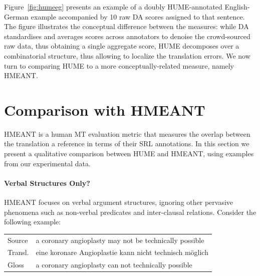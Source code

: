 \documentclass[11pt,letterpaper]{article}
\begin{document}

Figure~\ref{fig:humeeg} presents an example of a doubly HUME-annotated English-German example
accompanied by 10 raw DA scores assigned to that sentence.
The figure illustrates the conceptual difference between the measures:
while DA standardises and averages scores across annotators to denoise the
crowd-sourced raw data, thus obtaining a single aggregate score,
HUME decomposes over a combinatorial structure, thus allowing to
localize the translation errors. We now turn to comparing HUME to a more
conceptually-related  measure, namely HMEANT.


\section{Comparison with HMEANT}\label{sec:hmeant_comp}


HMEANT is a human MT evaluation metric that measures the overlap between the translation a reference
in terms of their SRL annotations.
In this section we present a qualitative comparison between HUME and HMEANT,
using examples from our experimental data.


\paragraph{Verbal Structures Only?}

HMEANT focuses on verbal argument structures, ignoring other pervasive phenomena such as non-verbal predicates and inter-clausal relations. Consider the following example:

\begin{center}
\begin{tabular}{lp{5.4cm}}
Source & \small a coronary angioplasty may not be technically possible \\
Transl.& \small eine koronare Angioplastie kann nicht technisch m{\"o}glich \\
Gloss & \small a coronary angioplasty can not technically possible \\
\end{tabular}
\end{center}
\end{document}
